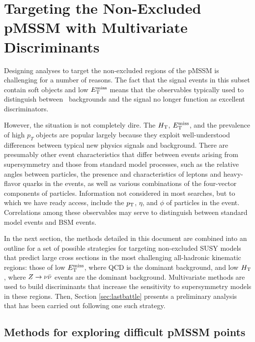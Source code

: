 \chapter{Targeting the Non-Excluded pMSSM with Multivariate Discriminants}
\label{chap:money}

Designing analyses to target the non-excluded regions of the pMSSM is challenging for a number of reasons. The fact that the signal events in this subset contain soft objects and low $E_{\text{T}}^{\rm miss}$ means that the observables typically used to distinguish between \SM~backgrounds and the signal no longer function as excellent discriminators. 

However, the situation is not completely dire. The  $H_{\rm T}$, $E_{\text{T}}^{\rm miss}$, and the prevalence of high $p_{T}$ objects are popular largely because they exploit well-understood differences between typical new physics signals and background. There are presumably other event characteristics that differ between events arising from supersymmetry and those from standard model processes, such as the relative angles between particles, the presence and characteristics of leptons and heavy-flavor quarks in the events, as well as various combinations of the four-vector components of particles. Information not considered in most searches, but to which we have ready access, include the $p_{\text{T}}$, $\eta$, and $\phi$ of particles in the event. Correlations among these observables may serve to distinguish between standard model events and BSM events.

In the next section, the methods detailed in this document are combined into an outline for a set of possible strategies for targeting non-excluded SUSY models that predict large cross sections in the most challenging all-hadronic kinematic regions: those of low $E_{\text{T}}^{\rm miss}$, where QCD is the dominant background, and low $H_{\rm T}$, where $Z\rightarrow \nu\bar{\nu}$ events are the dominant background. Multivariate methods are used to build discriminants that increase the sensitivity to supersymmetry models in these regions. Then, Section \ref{sec:lastbattle} presents a preliminary analysis that has been carried out following one such strategy. 

\section{Methods for exploring difficult pMSSM points}

